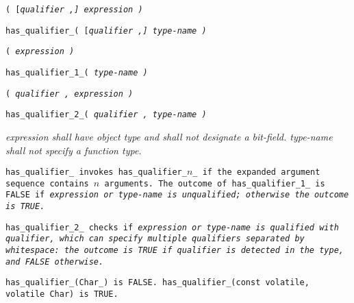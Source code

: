 
\s\s\s\tt{(} [\it{qualifier} \tt{,}] \it{expression} \tt{)}

 \tt{has_qualifier_}\s\s\s\tt{(} [\it{qualifier} \tt{,}] \it{type-name}  \tt{)}

\s\tt{(} \it{expression} \tt{)}

 \tt{has_qualifier_1_}\s\tt{(} \it{type-name}  \tt{)}

\s\tt{(}
\phantom{[}\it{qualifier} \tt{,}\phantom{]} \it{expression} \tt{)}

 \tt{has_qualifier_2_}\s\tt{(}
\phantom{[}\it{qualifier} \tt{,}\phantom{]} \it{type-name}  \tt{)}


\it{expression} shall have object type and shall not designate a bit-field.
\it{type-name}  shall not specify a function type.


\tt{has_qualifier_} invokes \tt{has_qualifier_}$n$\_ if
the expanded argument sequence contains $n$ arguments.
The outcome of \tt{has_qualifier_1_} is \tt{FALSE} if \it{expression}
or \it{type-name} is unqualified; otherwise the outcome is \tt{TRUE}.

\tt{has_qualifier_2_} checks if \it{expression} or \it{type-name} is qualified
with \it{qualifier}, which can specify multiple qualifiers separated by
whitespace: the outcome is \tt{TRUE} if \it{qualifier} is detected in the type,
and \tt{FALSE} otherwise.

\example \tt{has_qualifier_(Char_)} is \tt{FALSE}.
\tt{has_qualifier_(const volatile, volatile Char)} is \tt{TRUE}.

\pagebreak
